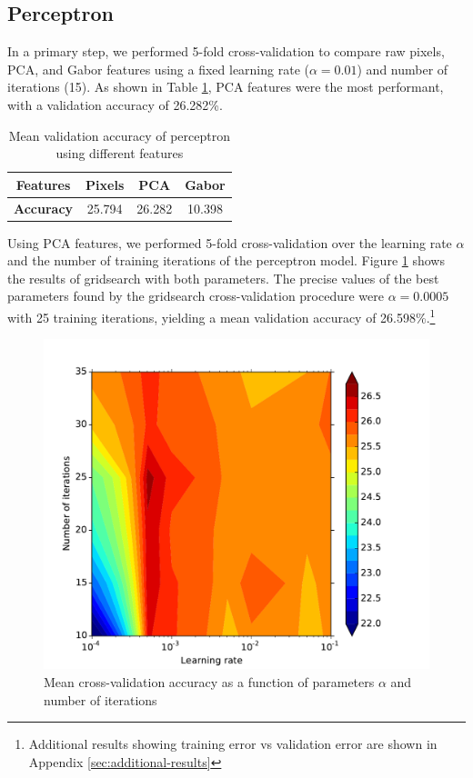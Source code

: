 \documentclass{acm_proc_article-sp}
\begin{document}
\subsection{Perceptron}
In a primary step, we performed 5-fold cross-validation to compare raw pixels, PCA, and Gabor features using a fixed learning rate ($\alpha = 0.01$) and number of iterations (15). As shown in Table \ref{tab:perc-features}, PCA features were the most performant, with a validation accuracy of 26.282\%.
\begin{table}[h!]
  \centering
  \begin{tabular}{|c||c|c|c| }
    \hline
    {\bfseries Features} & Pixels & PCA & Gabor \\
    \hline
    {\bfseries Accuracy} & 25.794 & 26.282 & 10.398 \\
    \hline
  \end{tabular}
  \caption{Mean validation accuracy of perceptron using different features}
  \label{tab:perc-features}
\end{table}

Using PCA features, we performed 5-fold cross-validation over the learning rate $\alpha$ and the number of training iterations of the perceptron model. Figure \ref{fig:perc-gridsearch} shows the results of gridsearch with both parameters. The precise values of the best parameters found by the gridsearch cross-validation procedure were $\alpha = 0.0005$ with 25 training iterations, yielding a mean validation accuracy of 26.598\%.\footnote{Additional results showing training error vs validation error are shown in Appendix \ref{sec:additional-results}}
\begin{figure}[h!]
	\centering
	\includegraphics[width=\linewidth]{perceptron_gridsearch}
  	\caption{Mean cross-validation accuracy as a function of parameters $\alpha$ and number of iterations}
  	\label{fig:perc-gridsearch}
\end{figure}
\end{document}
